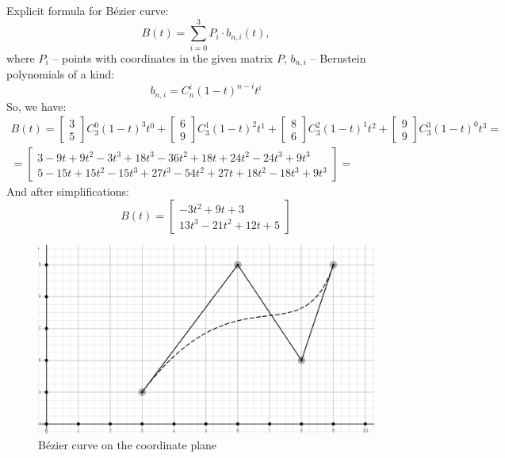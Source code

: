 \documentclass[12pt]{report}
\begin{document}
\begin{solution}
      Explicit formula for Bézier curve:
      \[
          B(t) = \sum\limits_{i=0}^3 P_i \cdot b_{n,i}(t),  
      \]
      where $P_i$ -- points with coordinates in the given matrix $P$, $b_{n,i}$ -- Bernstein polynomials of a kind:
      \[
          b_{n,i} = C_n^i (1-t)^{n-i}t^i   
      \]
      So, we have:
      \[
         \begin{array}{c}            
         \displaystyle B(t) = \begin{bmatrix}
            3 \\ 5
         \end{bmatrix} C_3^0 (1-t)^3t^0 + \begin{bmatrix}
            6 \\ 9
         \end{bmatrix} C_3^1 (1-t)^2t^1 + \begin{bmatrix}
            8 \\ 6
         \end{bmatrix} C_3^2 (1-t)^1t^2 + \begin{bmatrix}
            9 \\ 9
         \end{bmatrix} C_3^3 (1-t)^0 t^3 = \\[0.5cm]
         \displaystyle = \begin{bmatrix}
            3 - 9t + 9t^2 -3t^3 + 18t^3 - 36t^2 + 18t + 24t^2 - 24t^3 + 9t^3 \\
            5 - 15t + 15t^2 - 15t^3 + 27t^3 - 54t^2 + 27t + 18t^2 - 18t^3 + 9t^3
         \end{bmatrix} = 
      \end{array}
      \]
      And after simplifications:
      \[
         B(t) = \begin{bmatrix}
            - 3t^2 + 9t + 3\\
            13t^3 - 21t^2 + 12t + 5
         \end{bmatrix}
      \]
      \begin{figure}[H]
         \centering
         \includegraphics[scale=0.6]{images/bezier.png}
         \caption*{Bézier curve on the coordinate plane}
      \end{figure}
\end{solution}
\end{document}
